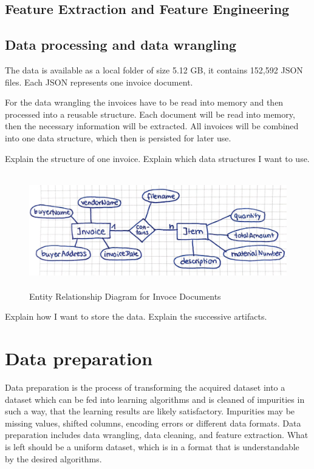 	\subsection{Feature Extraction and Feature Engineering}


\subsection{Data processing and data wrangling}
The data is available as a local folder of size 5.12 GB, it contains 152,592 \ac{JSON} files. Each \ac{JSON} represents one invoice document. 
	
For the data wrangling the invoices have to be read into memory and then processed into a reusable structure. Each document will be read into memory, then the necessary information will be extracted. All invoices will be combined into one data structure, which then is persisted for later use.

Explain the structure of one invoice.
Explain which data structures I want to use.

\begin{figure}[ht]
	\centering
	\includegraphics[height=5cm]{Bilder/practical/entity_relationship.png}
	\caption{Entity Relationship Diagram for Invoce Documents}
	\label{fig:er}
\end{figure}


Explain how I want to store the data. Explain the successive artifacts.

    \section{Data preparation}

    Data preparation is the process of transforming the acquired dataset into a dataset which can be fed into learning algorithms and is cleaned of impurities in such a way, that the learning results are likely satisfactory. Impurities may be missing values, shifted columns, encoding errors or different data formats. 
    Data preparation includes data wrangling, data cleaning, and feature extraction. What is left should be a uniform dataset, which is in a format that is understandable by the desired algorithms.
    

